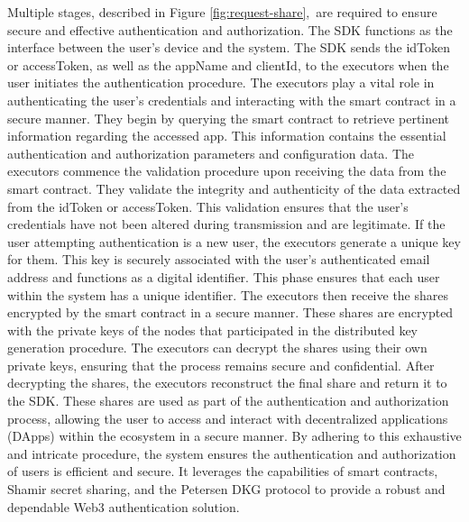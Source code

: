 \documentclass[../Main.tex]{subfiles}
\begin{document}
Multiple stages, described in Figure \ref{fig:request-share}, are required to ensure secure and effective authentication and authorization. The SDK functions as the interface between the user's device and the system. The SDK sends the idToken or accessToken, as well as the appName and clientId, to the executors when the user initiates the authentication procedure. The executors play a vital role in authenticating the user's credentials and interacting with the smart contract in a secure manner. They begin by querying the smart contract to retrieve pertinent information regarding the accessed app. This information contains the essential authentication and authorization parameters and configuration data. The executors commence the validation procedure upon receiving the data from the smart contract. They validate the integrity and authenticity of the data extracted from the idToken or accessToken. This validation ensures that the user's credentials have not been altered during transmission and are legitimate. If the user attempting authentication is a new user, the executors generate a unique key for them. This key is securely associated with the user's authenticated email address and functions as a digital identifier. This phase ensures that each user within the system has a unique identifier. The executors then receive the shares encrypted by the smart contract in a secure manner. These shares are encrypted with the private keys of the nodes that participated in the distributed key generation procedure. The executors can decrypt the shares using their own private keys, ensuring that the process remains secure and confidential. After decrypting the shares, the executors reconstruct the final share and return it to the SDK. These shares are used as part of the authentication and authorization process, allowing the user to access and interact with decentralized applications (DApps) within the ecosystem in a secure manner. By adhering to this exhaustive and intricate procedure, the system ensures the authentication and authorization of users is efficient and secure. It leverages the capabilities of smart contracts, Shamir secret sharing, and the Petersen DKG protocol to provide a robust and dependable Web3 authentication solution.
\end{document}
